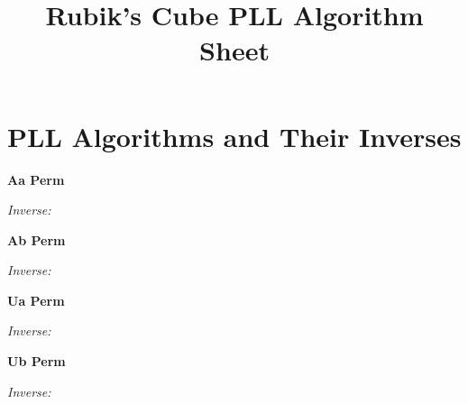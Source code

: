 \documentclass{pll}
\begin{document}
\title{Rubik's Cube PLL Algorithm Sheet}
\date{}
\maketitle

\section*{PLL Algorithms and Their Inverses}

\begin{multicols}{2}

\textbf{Aa Perm}\\
\RubikCubeSolvedWY{}
\RubikRotation{\AaPerm}
\vspace{0.2cm}

\textit{Inverse:}\\
\RubikCubeSolvedWY{}
\vspace{0.4cm}

\textbf{Ab Perm}\\
\RubikCubeSolvedWY{}
\RubikRotation{\AbPerm}
\vspace{0.2cm}

\textit{Inverse:}\\
\RubikCubeSolvedWY{}
\vspace{0.4cm}

\textbf{Ua Perm}\\
\RubikCubeSolvedWY{}
\RubikRotation{\UaPerm}
\vspace{0.2cm}

\textit{Inverse:}\\
\RubikCubeSolvedWY{}
\vspace{0.4cm}

\textbf{Ub Perm}\\
\RubikCubeSolvedWY{}
\RubikRotation{\UbPerm}
\vspace{0.2cm}

\textit{Inverse:}\\
\RubikCubeSolvedWY{}
\vspace{0.4cm}


\end{multicols}
\end{document}
